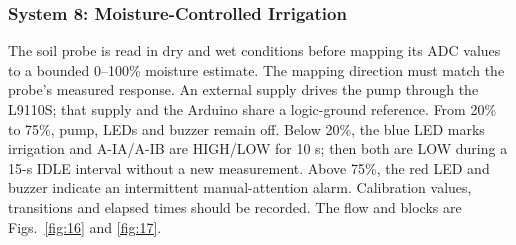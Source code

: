 \subsubsection{System 8: Moisture-Controlled Irrigation}
The soil probe is read in dry and wet conditions before mapping its ADC
values to a bounded 0--100\% moisture estimate. The mapping direction must
match the probe's measured response. An external supply drives the pump
through the L9110S; that supply and the Arduino share a logic-ground
reference. From 20\% to 75\%, pump, LEDs and buzzer remain off. Below 20\%,
the blue LED marks irrigation and A-IA/A-IB are HIGH/LOW for 10 s; then both
are LOW during a 15-s IDLE interval without a new measurement. Above 75\%,
the red LED and buzzer indicate an intermittent manual-attention alarm.
Calibration values, transitions and elapsed times should be recorded. The
flow and blocks are Figs.~\ref{fig:16} and \ref{fig:17}.
